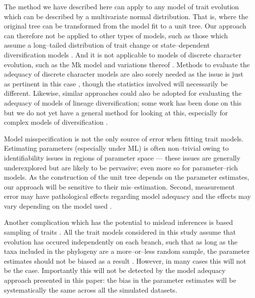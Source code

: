 \documentclass[12pt]{article}
\begin{document}
The method we have described here can apply to any model of trait evolution which can be described by a multivariate normal distribution. That is, where the original tree can be transformed from the model fit to a unit tree. Our approach can therefore not be applied to other types of models, such as those which assume a long--tailed distribution of trait change \citep[e.g.][]{Landis2012} or state--dependent diversification models \citep[e.g.][]{Bokma2008, Bokma2010, FitzJohn2010}. And it is not applicable to models of discrete character evolution, such as the Mk model \citep{Pagel1994, Lewis2001} and variations thereof \citep[e.g.][]{Maddison2007, WagnerMarcot2010, Mazeralli2012, Beaulieu2013} \citep[but see Felsenstein's threshold model;][]{Felsenstein2005, Felsenstein2012}. Methods to evaluate the adequacy of discrete character models are also sorely needed as the issue is just as pertinent in this case \citep{ReadNee1995}, though the statistics involved will necessarily be different. Likewise, similar approaches could also be adopted for evaluating the adequacy of models of lineage diversification; some work has been done on this \citep[e.g.][]{Rabosky2009AmNat, Rabosky2012} but we do not yet have a general method for looking at this, especially for complex models of diversification \citep[e.g.][]{Stadler2011, Etienne2012}.

Model misspecification is not the only source of error when fitting trait models. Estimating parameters (especially under ML) is often non--trivial owing to identifiability issues in regions of parameter space \citep{Ane2008, HoAne2012} --- these issues are generally underexplored but are likely to be pervasive; even more so for parameter--rich models. As the construction of the unit tree depends on the parameter estimates, our approach will be sensitive to their mis--estimation. Second, measurement error may have pathological effects regarding model adequacy \citep{HarmonLosos2005} and the effects may vary depending on the model used \citep{RevellReynolds2012, PennellPE}.


Another complication which has the potential to mislead inferences is based sampling of traits \citep{Freckletoninaction, longeuroname, FitzJohnwoody}. All the trait models considered in this study assume that evolution has occured independently on each branch, such that as long as the taxa included in the phylogeny are a more--or--less random sample, the parameter estimates should not be biased as a result \citep{PennellHarmon}. However, in many cases \citep[especially when using large trait databases][]{FitzJohnwoody} this will not be the case. Importantly this will not be detected by the model adequacy approach presented in this paper: the bias in the parameter estimates will be systematically the same across all the simulated datasets.
\end{document}
